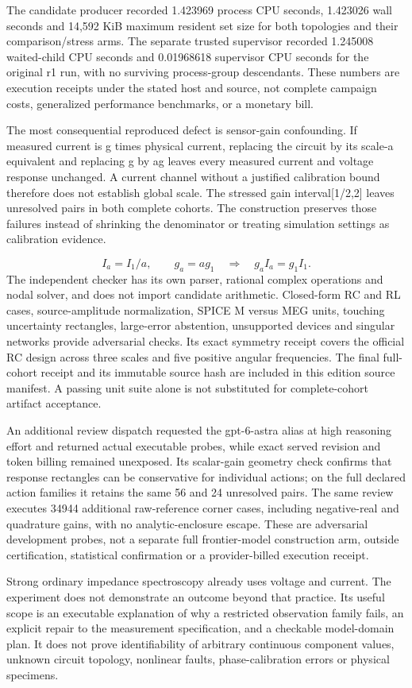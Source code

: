 \documentclass[10pt,letterpaper]{article}
\begin{document}
The candidate producer recorded 1.423969 process CPU seconds, 1.423026 wall seconds and 14,592 KiB maximum resident set size for both topologies and their comparison/stress arms. The separate trusted supervisor recorded 1.245008 waited-child CPU seconds and 0.01968618 supervisor CPU seconds for the original r1 run, with no surviving process-group descendants. These numbers are execution receipts under the stated host and source, not complete campaign costs, generalized performance benchmarks, or a monetary bill.\par
The most consequential reproduced defect is sensor-gain confounding. If measured current is g times physical current, replacing the circuit by its scale-a equivalent and replacing g by ag leaves every measured current and voltage response unchanged. A current channel without a justified calibration bound therefore does not establish global scale. The stressed gain interval[1/2,2] leaves unresolved pairs in both complete cohorts. The construction preserves those failures instead of shrinking the denominator or treating simulation settings as calibration evidence.\par
\[ I_a=I_1/a,\qquad g_a=ag_1\quad\Longrightarrow\quad g_aI_a=g_1I_1. \]
The independent checker has its own parser, rational complex operations and nodal solver, and does not import candidate arithmetic. Closed-form RC and RL cases, source-amplitude normalization, SPICE M versus MEG units, touching uncertainty rectangles, large-error abstention, unsupported devices and singular networks provide adversarial checks. Its exact symmetry receipt covers the official RC design across three scales and five positive angular frequencies. The final full-cohort receipt and its immutable source hash are included in this edition source manifest. A passing unit suite alone is not substituted for complete-cohort artifact acceptance.\par
An additional review dispatch requested the gpt-6-astra alias at high reasoning effort and returned actual executable probes, while exact served revision and token billing remained unexposed. Its scalar-gain geometry check confirms that response rectangles can be conservative for individual actions; on the full declared action families it retains the same 56 and 24 unresolved pairs. The same review executes 34944 additional raw-reference corner cases, including negative-real and quadrature gains, with no analytic-enclosure escape. These are adversarial development probes, not a separate full frontier-model construction arm, outside certification, statistical confirmation or a provider-billed execution receipt.\par
Strong ordinary impedance spectroscopy already uses voltage and current. The experiment does not demonstrate an outcome beyond that practice. Its useful scope is an executable explanation of why a restricted observation family fails, an explicit repair to the measurement specification, and a checkable model-domain plan. It does not prove identifiability of arbitrary continuous component values, unknown circuit topology, nonlinear faults, phase-calibration errors or physical specimens.\par
\end{document}
